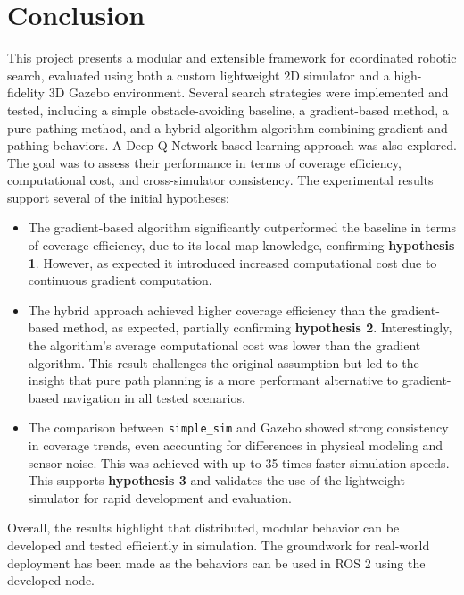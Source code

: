 \section{Conclusion}
\label{sec:Conclusion}
This project presents a modular and extensible framework for coordinated robotic search, evaluated using both a custom lightweight 2D simulator and a high-fidelity 3D Gazebo environment. Several search strategies were implemented and tested, including a simple obstacle-avoiding baseline, a gradient-based method, a pure pathing method, and a hybrid algorithm algorithm combining gradient and pathing behaviors. A Deep Q-Network based learning approach was also explored. The goal was to assess their performance in terms of coverage efficiency, computational cost, and cross-simulator consistency. The experimental results support several of the initial hypotheses:

\begin{itemize}
    \item The gradient-based algorithm significantly outperformed the baseline in terms of coverage efficiency, due to its local map knowledge, confirming \textbf{hypothesis 1}. However, as expected it introduced increased computational cost due to continuous gradient computation.

    \item The hybrid approach achieved higher coverage efficiency than the gradient-based method, as expected, partially confirming \textbf{hypothesis 2}. Interestingly, the algorithm's average computational cost was lower than the gradient algorithm. This result challenges the original assumption but led to the insight that pure path planning is a more performant alternative to gradient-based navigation in all tested scenarios.

    \item The comparison between \texttt{simple\_sim} and Gazebo showed strong consistency in coverage trends, even accounting for differences in physical modeling and sensor noise. This was achieved with up to 35 times faster simulation speeds. This supports \textbf{hypothesis 3} and validates the use of the lightweight simulator for rapid development and evaluation.

\end{itemize}

Overall, the results highlight that distributed, modular behavior can be developed and tested efficiently in simulation. The groundwork for real-world deployment has been made as the behaviors can be used in ROS 2 using the developed node.
